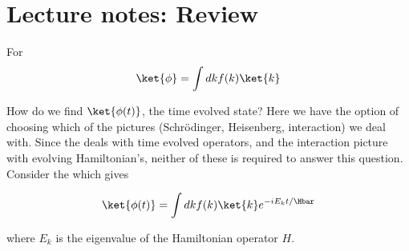 %
%
\section{Lecture notes: Review}

For
\begin{equation}\label{eqn:lecture5BigReviewCh3Dynamical:20}
\ket{\phi} = \int dk f(k) \ket{k}
\end{equation}

How do we find \(\ket{\phi(t)}\), the time evolved state?  Here we have the option of choosing which of the pictures (Schr\"{o}dinger, Heisenberg, interaction) we deal with.  Since the  deals with time evolved operators, and the interaction picture with evolving Hamiltonian's, neither of these is required to answer this question.  Consider the  which gives

\begin{equation}\label{eqn:lecture5BigReviewCh3Dynamical:40}
\ket{\phi(t)} = \int dk f(k) \ket{k} e^{-i E_k t/\Hbar}
\end{equation}

where \(E_k\) is the eigenvalue of the Hamiltonian operator \(H\).


